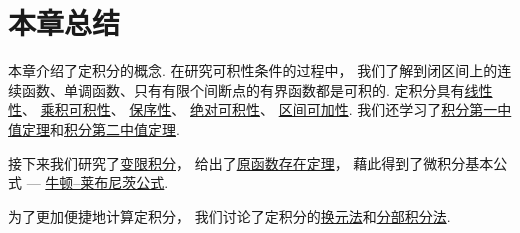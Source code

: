 \section{本章总结}
本章介绍了定积分的概念.
在研究可积性条件的过程中，
我们了解到闭区间上的连续函数、单调函数、只有有限个间断点的有界函数都是可积的.
定积分具有\hyperref[theorem:定积分.定积分性质1]{线性性}、
\hyperref[theorem:定积分.乘积可积性]{乘积可积性}、
\hyperref[theorem:定积分.定积分性质5推论1]{保序性}、
\hyperref[theorem:定积分.定积分性质5推论2]{绝对可积性}、
\hyperref[theorem:定积分.定积分性质3]{区间可加性}.
我们还学习了\hyperref[theorem:定积分.积分中值定理1]{积分第一中值定理}和\hyperref[theorem:定积分.积分中值定理2]{积分第二中值定理}.

接下来我们研究了\hyperref[theorem:定积分.变限积分定理]{变限积分}，
给出了\hyperref[theorem:定积分.原函数存在定理]{原函数存在定理}，
藉此得到了微积分基本公式 --- \hyperref[equation:定积分.牛顿--莱布尼茨公式]{牛顿--莱布尼茨公式}.

为了更加便捷地计算定积分，
我们讨论了定积分的\hyperref[theorem:定积分.定积分的换元法]{换元法}和\hyperref[theorem:定积分.定积分的分部积分法]{分部积分法}.

